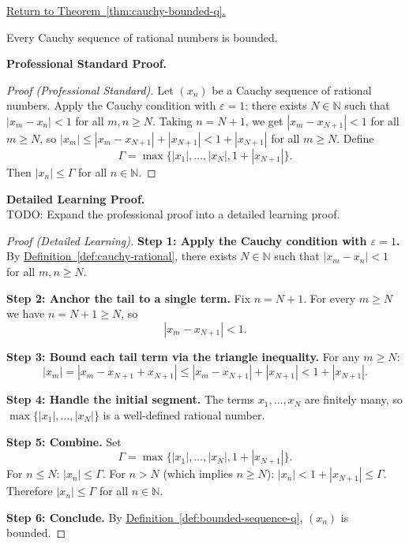
\newpage
{}
\label{prf:cauchy-bounded-q}

\begin{remark*}[Return]
\hyperref[thm:cauchy-bounded-q]{Return to Theorem~\ref*{thm:cauchy-bounded-q}.}
\end{remark*}

\begin{theorem*}
Every Cauchy sequence of rational numbers is bounded.
\end{theorem*}

\textbf{Professional Standard Proof.}~\\
\begin{proof}
[Proof (Professional Standard)]
Let $(x_n)$ be a Cauchy sequence of rational numbers.
Apply the Cauchy condition with $\varepsilon = 1$: there exists
$N \in \mathbb{N}$ such that $|x_m - x_n| < 1$ for all $m, n \geq N$.
Taking $n = N + 1$, we get $|x_m - x_{N+1}| < 1$ for all $m \geq N$,
so $|x_m| \leq |x_m - x_{N+1}| + |x_{N+1}| < 1 + |x_{N+1}|$
for all $m \geq N$.
Define
\[
\Gamma = \max\{|x_1|, \ldots, |x_N|, 1 + |x_{N+1}|\}.
\]
Then $|x_n| \leq \Gamma$ for all $n \in \mathbb{N}$.
\end{proof}

\textbf{Detailed Learning Proof.}~\\
TODO: Expand the professional proof into a detailed learning proof.


\begin{proof}[Proof (Detailed Learning)]
\textbf{Step 1: Apply the Cauchy condition with $\varepsilon = 1$.}
By \hyperref[def:cauchy-rational]{Definition~\ref*{def:cauchy-rational}},
there exists $N \in \mathbb{N}$ such that
$|x_m - x_n| < 1$ for all $m, n \geq N$.

\textbf{Step 2: Anchor the tail to a single term.}
Fix $n = N + 1$.  For every $m \geq N$ we have $n = N + 1 \geq N$, so
\[
|x_m - x_{N+1}| < 1.
\]

\textbf{Step 3: Bound each tail term via the triangle inequality.}
For any $m \geq N$:
\[
|x_m| = |x_m - x_{N+1} + x_{N+1}|
\leq |x_m - x_{N+1}| + |x_{N+1}|
< 1 + |x_{N+1}|.
\]

\textbf{Step 4: Handle the initial segment.}
The terms $x_1, \ldots, x_N$ are finitely many, so
$\max\{|x_1|, \ldots, |x_N|\}$ is a well-defined rational number.

\textbf{Step 5: Combine.}
Set
\[
\Gamma = \max\{|x_1|, \ldots, |x_N|, 1 + |x_{N+1}|\}.
\]
For $n \leq N$: $|x_n| \leq \Gamma$.
For $n > N$ (which implies $n \geq N$): $|x_n| < 1 + |x_{N+1}| \leq \Gamma$.
Therefore $|x_n| \leq \Gamma$ for all $n \in \mathbb{N}$.

\textbf{Step 6: Conclude.}
By \hyperref[def:bounded-sequence-q]{Definition~\ref*{def:bounded-sequence-q}},
$(x_n)$ is bounded.
\end{proof}

